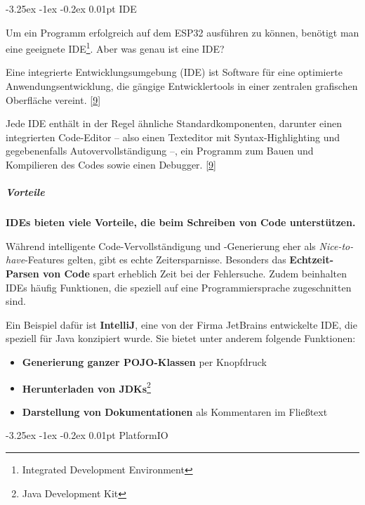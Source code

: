 \documentclass[
    headings=optiontotocandhead,%
    twoside,
    numbers=noenddot,%
    12pt, %
    titlepage, %
    parskip=full, %
    listof=leveldown, 
    numbers=noenddot, %
    a4paper,DIV=14,
    BCOR=15mm,
]{scrbook}
\makeatletter
\renewenvironment{quote}{\begin{customblockquote}\list{}{\rightmargin=0em\leftmargin=0em}%
\item\relax\color{blockquote-text}\ignorespaces}{\unskip\unskip\endlist\end{customblockquote}}
\providecommand{\tightlist}{%
  \setlength{\itemsep}{0pt}\setlength{\parskip}{0pt}}
\renewcommand\paragraph{\@startsection{paragraph}{4}{\z@}%
    {-3.25ex \@plus -1ex \@minus -0.2ex}%
    {0.01pt}%
    {\raggedsection\normalfont\sectfont\nobreak\size@paragraph}%
  }
\makeatother
\begin{document}
\hypertarget{ide}{%
\paragraph{IDE}\label{ide}}

Um ein Programm erfolgreich auf dem ESP32 ausführen zu können, benötigt
man eine geeignete IDE\footnote{Integrated Development Environment}.
Aber was genau ist eine IDE?

\begin{quote}
Eine integrierte Entwicklungsumgebung (IDE) ist Software für eine
optimierte Anwendungsentwicklung, die gängige Entwicklertools in einer
zentralen grafischen Oberfläche vereint.
{[}\protect\hyperlink{ref-RedHatIDE}{9}{]}
\end{quote}

Jede IDE enthält in der Regel ähnliche Standardkomponenten, darunter
einen integrierten Code-Editor -- also einen Texteditor mit
Syntax-Highlighting und gegebenenfalls Autovervollständigung --, ein
Programm zum Bauen und Kompilieren des Codes sowie einen Debugger.
{[}\protect\hyperlink{ref-RedHatIDE}{9}{]}

\hypertarget{vorteile}{%
\subparagraph{Vorteile}\label{vorteile}}

\textbf{IDEs bieten viele Vorteile, die beim Schreiben von Code
unterstützen.}

Während intelligente Code-Vervollständigung und -Generierung eher als
\emph{Nice-to-have}-Features gelten, gibt es echte Zeitersparnisse.
Besonders das \textbf{Echtzeit-Parsen von Code} spart erheblich Zeit bei
der Fehlersuche. Zudem beinhalten IDEs häufig Funktionen, die speziell
auf eine Programmiersprache zugeschnitten sind.

Ein Beispiel dafür ist \textbf{IntelliJ}, eine von der Firma JetBrains
entwickelte IDE, die speziell für Java konzipiert wurde. Sie bietet
unter anderem folgende Funktionen:

\begin{itemize}
\tightlist
\item
  \textbf{Generierung ganzer POJO-Klassen} per Knopfdruck
\item
  \textbf{Herunterladen von JDKs}\footnote{Java Development Kit}
\item
  \textbf{Darstellung von Dokumentationen} als Kommentaren im Fließtext
\end{itemize}

\hypertarget{platformio}{%
\paragraph{PlatformIO}\label{platformio}}
\end{document}
